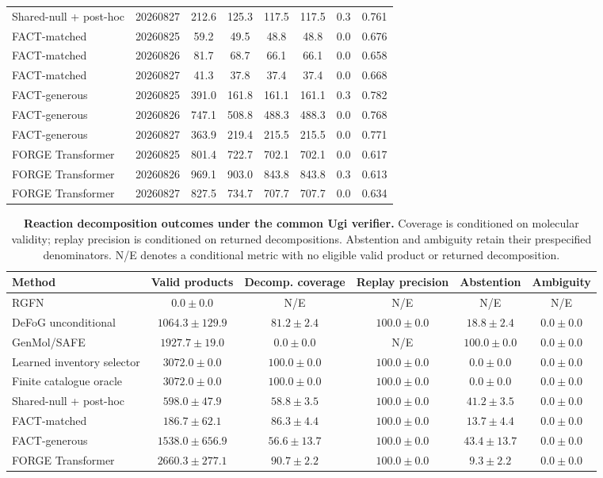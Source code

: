 \documentclass{article}
\begin{document}
\begin{table}[H]
{\begin{tabular}{llcccccc}
Shared-null + post-hoc & 20260827 & 212.6 & 125.3 & 117.5 & 117.5 & 0.3 & 0.761 \\
FACT-matched & 20260825 & 59.2 & 49.5 & 48.8 & 48.8 & 0.0 & 0.676 \\
FACT-matched & 20260826 & 81.7 & 68.7 & 66.1 & 66.1 & 0.0 & 0.658 \\
FACT-matched & 20260827 & 41.3 & 37.8 & 37.4 & 37.4 & 0.0 & 0.668 \\
FACT-generous & 20260825 & 391.0 & 161.8 & 161.1 & 161.1 & 0.3 & 0.782 \\
FACT-generous & 20260826 & 747.1 & 508.8 & 488.3 & 488.3 & 0.0 & 0.768 \\
FACT-generous & 20260827 & 363.9 & 219.4 & 215.5 & 215.5 & 0.0 & 0.771 \\
FORGE Transformer & 20260825 & 801.4 & 722.7 & 702.1 & 702.1 & 0.0 & 0.617 \\
FORGE Transformer & 20260826 & 969.1 & 903.0 & 843.8 & 843.8 & 0.3 & 0.613 \\
FORGE Transformer & 20260827 & 827.5 & 734.7 & 707.7 & 707.7 & 0.0 & 0.634 \\%
\end{tabular}
}
\end{table}

\begin{table}[H]
\caption{\textbf{Reaction decomposition outcomes under the common Ugi verifier.}
Coverage is conditioned on molecular validity; replay precision is conditioned on returned
decompositions. Abstention and ambiguity retain their prespecified denominators. N/E denotes a
conditional metric with no eligible valid product or returned decomposition.}
\label{tab:baseline-decomposition}
\centering
\scriptsize
\setlength{\tabcolsep}{4.5pt}
\begin{tabular}{lccccc}
\hline
Method & Valid products & Decomp. coverage & Replay precision & Abstention & Ambiguity \\
\hline
RGFN & $0.0\pm0.0$ & N/E & N/E & N/E & N/E \\
DeFoG unconditional & $1064.3\pm129.9$ & $81.2\pm2.4$ & $100.0\pm0.0$ & $18.8\pm2.4$ & $0.0\pm0.0$ \\
GenMol/SAFE & $1927.7\pm19.0$ & $0.0\pm0.0$ & N/E & $100.0\pm0.0$ & $0.0\pm0.0$ \\
Learned inventory selector & $3072.0\pm0.0$ & $100.0\pm0.0$ & $100.0\pm0.0$ & $0.0\pm0.0$ & $0.0\pm0.0$ \\
Finite catalogue oracle & $3072.0\pm0.0$ & $100.0\pm0.0$ & $100.0\pm0.0$ & $0.0\pm0.0$ & $0.0\pm0.0$ \\
Shared-null + post-hoc & $598.0\pm47.9$ & $58.8\pm3.5$ & $100.0\pm0.0$ & $41.2\pm3.5$ & $0.0\pm0.0$ \\
FACT-matched & $186.7\pm62.1$ & $86.3\pm4.4$ & $100.0\pm0.0$ & $13.7\pm4.4$ & $0.0\pm0.0$ \\
FACT-generous & $1538.0\pm656.9$ & $56.6\pm13.7$ & $100.0\pm0.0$ & $43.4\pm13.7$ & $0.0\pm0.0$ \\
FORGE Transformer & $2660.3\pm277.1$ & $90.7\pm2.2$ & $100.0\pm0.0$ & $9.3\pm2.2$ & $0.0\pm0.0$ \\%
\end{tabular}
\end{table}
\end{document}
